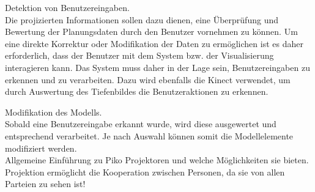 Detektion von Benutzereingaben.\\
Die projizierten Informationen sollen dazu dienen, eine Überprüfung und Bewertung der Planungsdaten durch den Benutzer vornehmen zu können. Um eine direkte Korrektur oder Modifikation der Daten zu ermöglichen ist es daher erforderlich, dass der Benutzer mit dem System bzw. der Visualisierung interagieren kann. Das System muss daher in der Lage sein, Benutzereingaben zu erkennen und zu verarbeiten. Dazu wird ebenfalls die Kinect verwendet, um durch Auswertung des Tiefenbildes die Benutzeraktionen zu erkennen.

Modifikation des Modells.\\
Sobald eine Benutzereingabe erkannt wurde, wird diese ausgewertet und entsprechend verarbeitet. Je nach Auswahl können somit die Modellelemente modifiziert werden.\\

Allgemeine Einführung zu Piko Projektoren und welche Möglichkeiten sie bieten.\\%
Projektion ermöglicht die Kooperation zwischen Personen, da sie von allen Parteien zu sehen ist!